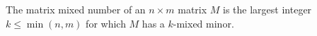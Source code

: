 The matrix mixed number of an \(n\times m\) matrix \(M\) is the largest
integer \(k\le \min(n,m)\) for which \(M\) has a \(k\)-mixed minor.
